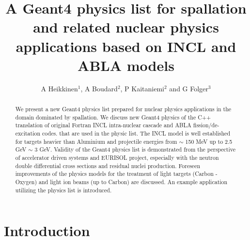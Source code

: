 \documentclass[a4paper]{jpconf}
\begin{document}
\title{A Geant4 physics list for spallation and related nuclear physics applications 
based on INCL and ABLA models}

\author{A Heikkinen$^1$, A Boudard$^2$, P Kaitaniemi$^2$ and G Folger$^3$}


\address{$^1$ Helsinki Institute of Physics, P.O. Box 64, FIN-00014 University of Helsinki, Finland}
\address{$^2$ CEN-Saclay, CEA-IRFU/SPhN, 91 191 Gif sur Yvette, France}
\address{$^3$ European Organization for Nuclear Research (CERN), Switzerland}


\begin{abstract}
We present a new Geant4 physics list prepared for nuclear physics applications
in the domain dominated by spallation.
We discuss new Geant4 physics of the C++ translation of original Fortran 
INCL intra-nuclear cascade and ABLA fission/de-excitation codes.
that are used in the physic list.
The INCL model is well established for targets heavier than Aluminium
and projectile energies from $\sim$ 150 MeV up to 2.5 GeV $\sim$ 3 GeV.
Validity of the Geant4 physics list is demonstrated from the perspective of accelerator driven systems
and EURISOL project, especially with the neutron double differential cross sections and residual
nuclei production.
Foreseen improvements of the physics models for the treatment of light targets (Carbon - Oxygen)
and light ion beams (up to Carbon) are discussed.
An example application utilizing the physics list is introduced.
\end{abstract}

\section{Introduction}
 
\end{document}
